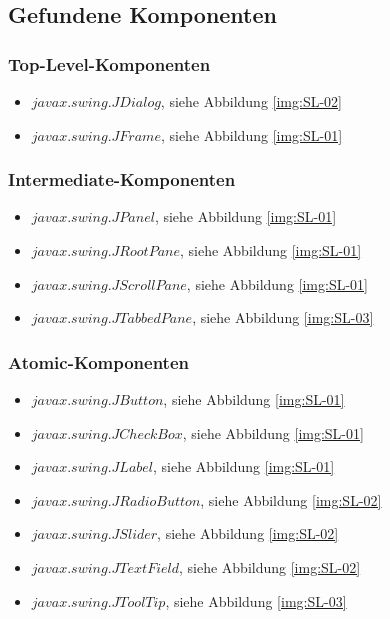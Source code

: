   \subsection{Gefundene Komponenten}
  
  \subsubsection{Top-Level-Komponenten}
  
  \begin{itemize}
    \item \(javax.swing.JDialog\), siehe Abbildung \ref{img:SL-02}
    \item \(javax.swing.JFrame\), siehe Abbildung \ref{img:SL-01}
  \end{itemize}
  
  \subsubsection{Intermediate-Komponenten}
  
  \begin{itemize}
    \item \(javax.swing.JPanel\), siehe Abbildung \ref{img:SL-01}
    \item \(javax.swing.JRootPane\), siehe Abbildung \ref{img:SL-01}
    \item \(javax.swing.JScrollPane\), siehe Abbildung \ref{img:SL-01}
    \item \(javax.swing.JTabbedPane\), siehe Abbildung \ref{img:SL-03}
  \end{itemize}
  
  \subsubsection{Atomic-Komponenten}
  
  \begin{itemize}
    \item \(javax.swing.JButton\), siehe Abbildung \ref{img:SL-01}
    \item \(javax.swing.JCheckBox\), siehe Abbildung \ref{img:SL-01}
    \item \(javax.swing.JLabel\), siehe Abbildung \ref{img:SL-01}
    \item \(javax.swing.JRadioButton\), siehe Abbildung \ref{img:SL-02}
    \item \(javax.swing.JSlider\), siehe Abbildung \ref{img:SL-02}
    \item \(javax.swing.JTextField\), siehe Abbildung \ref{img:SL-02}
    \item \(javax.swing.JToolTip\), siehe Abbildung \ref{img:SL-03}
  \end{itemize}
  
